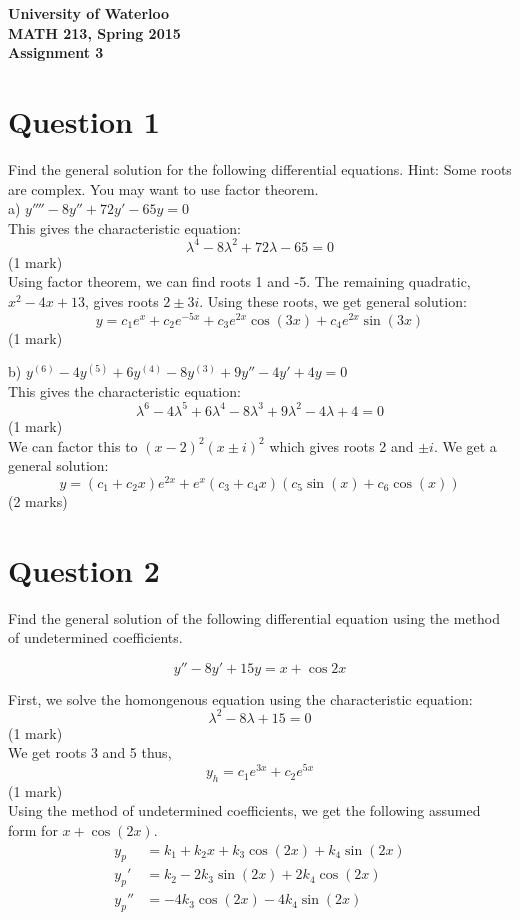 \documentclass[12pt]{article}
\begin{document}
\begin{center}
{\Large\bf University of Waterloo}\\
\vspace{3mm}
{\Large\bf MATH 213, Spring 2015}\\
\vspace{2mm}
{\Large\bf Assignment 3}\\
\end{center}

\section*{Question 1}

Find the general solution for the following differential equations. Hint: Some roots are complex. You may want to use factor theorem. \\

\noindent
a) $y'''' - 8y'' + 72y' - 65y = 0$ \\

\noindent This gives the characteristic equation:
$$\lambda^4 - 8\lambda^2 + 72\lambda - 65 = 0$$ \hfill (1 mark)
\\ Using factor theorem, we can find roots 1 and -5. The remaining quadratic, $x^2 - 4x + 13$, gives roots $2\pm3i$. Using these roots, we get general solution:
$$y = c_1 e^x + c_2e^{-5x} + c_3e^{2x}\cos(3x) + c_4 e^{2x}\sin(3x)$$ \hfill (1 mark)


\noindent
b) $y^{(6)} - 4y^{(5)} + 6y^{(4)} - 8y^{(3)} + 9y'' - 4y' + 4y = 0$ \\

\noindent This gives the characteristic equation:
$$\lambda^6 - 4\lambda^5 + 6\lambda^4 - 8\lambda^3 + 9\lambda^2 - 4\lambda + 4 = 0$$ \hfill (1 mark)
\\ We can factor this to $(x-2)^2(x\pm i)^2$ which gives roots 2 and $\pm i$. We get a general solution:
$$y=(c_1 + c_2x) e^{2x} + e^x(c_3 + c_4x)(c_5\sin(x) + c_6\cos(x))$$ \hfill (2 marks)

\section*{Question 2}

Find the general solution of the following differential equation using the method of undetermined coefficients.

$$y'' - 8y' + 15y = x + \cos 2x$$

\noindent First, we solve the homongenous equation using the characteristic equation:
$$\lambda^2 - 8\lambda + 15 = 0$$ \hfill (1 mark)
\\ We get roots 3 and 5 thus,
$$y_h = c_1 e^{3x} + c_2 e^{5x}$$ \hfill (1 mark)
\\ Using the method of undetermined coefficients, we get the following assumed form for $x + \cos(2x)$.
\begin{align*}
y_p &= k_1 + k_2x + k_3\cos(2x) + k_4\sin(2x)
\\ y_p' &= k_2 - 2k_3\sin(2x) + 2k_4\cos(2x)
\\ y_p'' &= -4k_3\cos(2x) - 4k_4\sin(2x) \tag{1 mark}
\end{align*}
\end{document}
